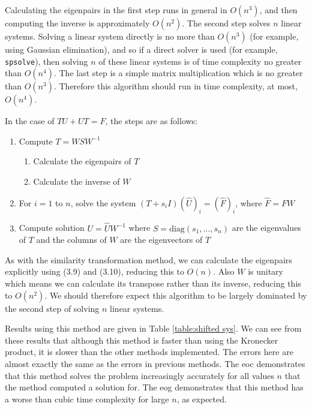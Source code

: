 \documentclass[11pt]{article}
\numberwithin{equation}{section}
\begin{document}
Calculating the eigenpairs in the first step runs in general in $O(n^3)$, and then computing the inverse is approximately $O(n^2)$. The second step solves $n$ linear systems. Solving a linear system directly is no more than $O(n^3)$ (for example, using Gaussian elimination), and so if a direct solver is used (for example, \texttt{spsolve}), then solving $n$ of these linear systems is of time complexity no greater than $O(n^4)$. The last step is a simple matrix multiplication which is no greater than $O(n^3)$. Therefore this algorithm should run in time complexity, at most, $O(n^4)$.

In the case of $TU + UT = F$, the steps are as follows:
\begin{enumerate}
\item Compute $T = WSW^{-1}$
	\begin{enumerate}
	\item Calculate the eigenpairs of $T$
	\item Calculate the inverse of $W$
	\end{enumerate}
\item For $i=1$ to $n$, solve the system $(T+s_i I)(\hat{U})_i = (\hat{F})_i$, where $\hat{F} = FW$
\item Compute solution $U = \hat{U}W^{-1}$
where $S = \text{diag}(s_1, \dots, s_n)$ are the eigenvalues of $T$ and the columns of $W$ are the eigenvectors of $T$
\end{enumerate}
As with the similarity transformation method, we can calculate the eigenpairs explicitly using (3.9) and (3.10), reducing this to $O(n)$. Also $W$ is unitary which means we can calculate its transpose rather than its inverse, reducing this to $O(n^2)$. We should therefore expect this algorithm to be largely dominated by the second step of solving $n$ linear systems.

Results using this method are given in Table \ref{table:shifted sys}. We can see from these results that although this method is faster than using the Kronecker product, it is slower than the other methods implemented. The errors here are almost exactly the same as the errors in previous methods. The eoc demonstrates that this method solves the problem increasingly accurately for all values $n$ that the method computed a solution for. The eog demonstrates that this method has a worse than cubic time complexity for large $n$, as expected.
\end{document}
